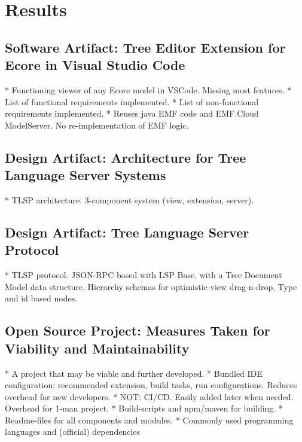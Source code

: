 \chapter{Results}\label{chap:results}

\section{Software Artifact: Tree Editor Extension for Ecore in Visual Studio Code}
* Functioning viewer of any Ecore model in VSCode. Missing most features.
  * List of functional requirements implemented.
  * List of non-functional requirements implemented.
* Reuses java EMF code and EMF.Cloud ModelServer. No re-implementation of EMF logic.

\section{Design Artifact: Architecture for Tree Language Server Systems}
* TLSP architecture. 3-component system (view, extension, server).

\section{Design Artifact: Tree Language Server Protocol}
* TLSP protocol. JSON-RPC based with LSP Base, with a Tree Document Model data structure. Hierarchy schemas for optimistic-view drag-n-drop. Type and id based nodes. 

\section{Open Source Project: Measures Taken for Viability and Maintainability}

* A project that may be viable and further developed.
  * Bundled IDE configuration: recommended extension, build tasks, run configurations. Reduces overhead for new developers.
  * NOT: CI/CD. Easily added later when needed. Overhead for 1-man project.
  * Build-scripts and npm/maven for building.
  * Readme-files for all components and modules.
  * Commonly used programming languages and (official) dependencies
  
